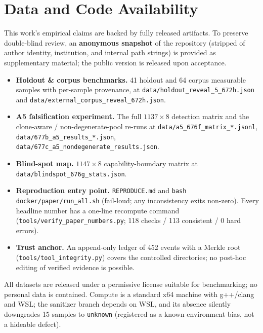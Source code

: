 
\section{Data and Code Availability}

This work's empirical claims are backed by fully released artifacts. To preserve
double-blind review, an \textbf{anonymous snapshot} of the repository (stripped of
author identity, institution, and internal path strings) is provided as supplementary
material; the public version is released upon acceptance.

\begin{itemize}
  \item \textbf{Holdout \& corpus benchmarks.} 41 holdout and 64 corpus measurable
        samples with per-sample provenance, at
        \texttt{data/holdout\_reveal\_5\_672h.json} and
        \texttt{data/external\_corpus\_reveal\_672h.json}.
  \item \textbf{A5 falsification experiment.} The full $1137\times 8$ detection matrix
        and the clone-aware / non-degenerate-pool re-runs at
        \texttt{data/a5\_676f\_matrix\_*.jsonl}, \texttt{data/677b\_a5\_results\_*.json},
        \texttt{data/677c\_a5\_nondegenerate\_results.json}.
  \item \textbf{Blind-spot map.} $1147\times 8$ capability-boundary matrix at
        \texttt{data/blindspot\_676g\_stats.json}.
  \item \textbf{Reproduction entry point.} \texttt{REPRODUCE.md} and
        \texttt{bash docker/paper/run\_all.sh} (fail-loud; any inconsistency exits non-zero).
        Every headline number has a one-line recompute command
        (\texttt{tools/verify\_paper\_numbers.py}; 118 checks / 113 consistent / 0 hard errors).
  \item \textbf{Trust anchor.} An append-only ledger of 452 events with a Merkle root
        (\texttt{tools/tool\_integrity.py}) covers the controlled directories; no
        post-hoc editing of verified evidence is possible.
\end{itemize}

All datasets are released under a permissive license suitable for benchmarking; no
personal data is contained. Compute is a standard x64 machine with g++/clang and WSL;
the sanitizer branch depends on WSL, and its absence silently downgrades 15 samples to
\texttt{unknown} (registered as a known environment bias, not a hideable defect).
